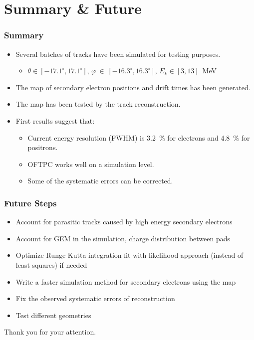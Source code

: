 \documentclass{beamer}
\begin{document}
	
	\section{Summary \& Future}	
	\begin{frame}
		\frametitle{Summary}
		\begin{itemize}
			\item Several batches of tracks have been simulated for testing purposes.
			\begin{itemize}
				\item $\theta\in[-17.1^\circ,17.1^\circ]$, $\varphi~\in~[-16.3^\circ,16.3^\circ]$, $ E_k \in [3,13] $~MeV
			\end{itemize}
			\item The map of secondary electron positions and drift times has been generated.
			\item The map has been tested by the track reconstruction.
			\item First results suggest that:
			\begin{itemize}
				\item Current energy resolution (FWHM) is 3.2~\% for electrons and 4.8~\% for positrons.
				\item OFTPC works well on a simulation level.
				\item Some of the systematic errors can be corrected.
			\end{itemize}
		\end{itemize}
	\end{frame}
	\begin{frame}
		\frametitle{Future Steps}
		\begin{itemize}
			\item Account for parasitic tracks caused by high energy secondary electrons
			\item Account for GEM in the simulation, charge distribution between pads
			\item Optimize Runge-Kutta integration fit with likelihood approach (instead of least squares) if needed
			\item Write a faster simulation method for secondary electrons using the map
			\item Fix the observed systematic errors of reconstruction
			\item Test different geometries
		\end{itemize}
	\end{frame}
	
	{
		\begin{frame}[noframenumbering]{}
			\begin{center}
				\Huge Thank you for your attention.
			\end{center}
		\end{frame}
	}
	
\end{document}
